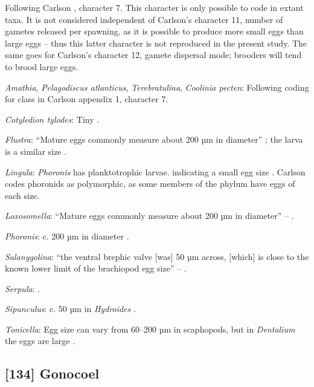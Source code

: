 \documentclass[openany]{book}
\theoremstyle{definition}
\theoremstyle{definition}
\theoremstyle{definition}
\theoremstyle{remark}
\begin{document}
Following Carlson \citeyearpar{Carlson1995Phylogeneticrelationships},
character 7. This character is only possible to code in extant taxa. It
is not considered independent of Carlson's character 11, number of
gametes released per spawning, as it is possible to produce more small
eggs than large eggs -- thus this latter character is not reproduced in
the present study. The same goes for Carlson's character 12, gamete
dispersal mode; brooders will tend to brood large eggs.

\hypertarget{Amathia-coding-133}{}
\emph{Amathia}, \emph{Pelagodiscus atlanticus}, \emph{Terebratulina},
\emph{Coolinia pecten}: Following coding for class in Carlson
\citeyearpar{Carlson1995Phylogeneticrelationships} appendix 1, character
7.

\hypertarget{Cotyledion_tylodes-coding-133}{}
\emph{Cotyledion tylodes}: Tiny \citep{Nielsen1966}.

\hypertarget{Flustra-coding-133}{}
\emph{Flustra}: ``Mature eggs commonly measure about 200 µm in
diameter'' \citep{Franzen1977}; the larva is a similar size
\citep{Reed1982}.

\hypertarget{Lingula-coding-133}{}
\emph{Lingula}: \emph{Phoronis} has planktotrophic larvae. indicating a
small egg size \citep{Ruppert2004Invertebratezoology}. Carlson
\citeyearpar{Carlson1995Phylogeneticrelationships} codes phoronids as
polymorphic, as some members of the phylum have eggs of each size.

\hypertarget{Loxosomella-coding-133}{}
\emph{Loxosomella}: ``Mature eggs commonly measure about 200 µm in
diameter'' -- \citet{Franzen1977}.

\hypertarget{Phoronis-coding-133}{}
\emph{Phoronis}: c. 200 µm in diameter \citep{Rice1988}.

\hypertarget{Salanygolina-coding-133}{}
\emph{Salanygolina}: ``the ventral brephic valve {[}was{]} 50 µm across,
{[}which{]} is close to the known lower limit of the brachiopod egg
size'' -- \citet{Popov2009Earlyontogeny}.

\hypertarget{Serpula-coding-133}{}
\emph{Serpula}: \citet{BucklandNicks1988}.

\hypertarget{Sipunculus-coding-133}{}
\emph{Sipunculus}: c. 50 µm in \emph{Hydroides} \citep{Miles2007}.

\hypertarget{Tonicella-coding-133}{}
\emph{Tonicella}: Egg size can vary from 60--200 µm in scaphopods, but
in \emph{Dentalium} the eggs are large \citep{DufresneDube1983}.

\subsection*{{[}134{]} Gonocoel}\label{gonocoel}
\end{document}

